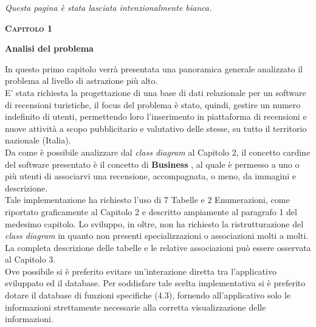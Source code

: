 \documentclass[a4paper,12pt]{article}
\begin{document}
\newpage\null\thispagestyle{empty}
\begin{center}
\vfil
\vfil
\textit{Questa pagina è stata lasciata intenzionalmente bianca. } 
\vfil
\vfil 
\end{center}
\newpage

\newpage\null{}\setcounter{page}{3} 
\begin{flushleft}

\vspace*{+2cm}
\Large\textsc{\bf Capitolo 1}
\vspace*{+1cm}

\begingroup
\fontsize{35pt}{12pt}\selectfont\bf{Analisi del problema}
\endgroup
\vspace*{+1cm}
\end{flushleft}

\normalsize{
In questo primo capitolo verrà presentata una panoramica generale analizzato il problema al livello di astrazione più alto.
\vspace*{+0.2cm}
\\E' stata richiesta la progettazione di una base di dati relazionale per un software di recensioni turistiche, il focus del problema è stato, quindi, gestire un numero indefinito di utenti, permettendo loro l'inserimento in piattaforma di recensioni e nuove attività a scopo pubblicitario e valutativo delle stesse, su tutto il territorio nazionale (Italia).
\vspace*{+0.2cm}
\\Da come è possibile analizzare dal {\it class diagram} al Capitolo 2, il concetto cardine del software presentato è il concetto di {\bf Business }, al quale è permesso a uno o più utenti di associarvi una recensione, accompagnata, o meno, da immagini e descrizione.
\vspace*{+0.2cm}
\\Tale implementazione ha richiesto l'uso di 7 Tabelle e 2 Enumerazioni, come riportato graficamente al Capitolo 2 e descritto ampiamente al paragrafo 1 del medesimo capitolo. Lo sviluppo, in oltre, non ha richiesto la ristrutturazione del {\it class diagram} in quanto non presenti specializzazioni o associazioni molti a molti. La completa descrizione delle tabelle e le relative associazioni può essere osservata al Capitolo 3.
\vspace*{+0.2cm}
\\Ove possibile si è preferito evitare un'interazione diretta tra l'applicativo sviluppato ed il database. Per soddisfare tale scelta implementativa si è preferito dotare il database di funzioni specifiche (4.3), fornendo all'applicativo solo le informazioni strettamente necessarie alla corretta visualizzazione delle informazioni.
}
\end{document}
